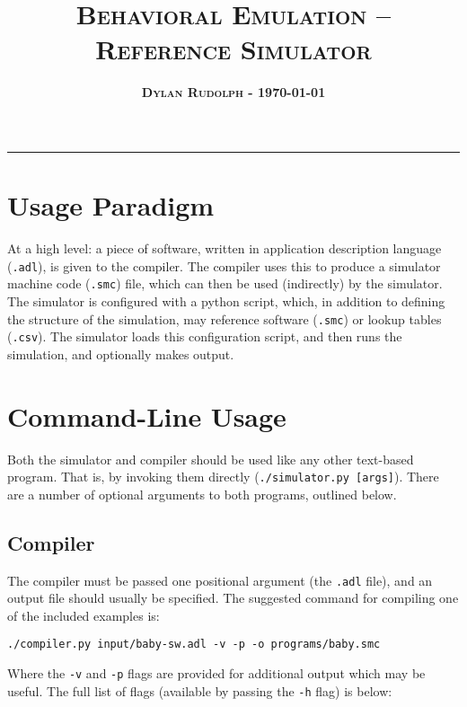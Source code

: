 \documentclass [letterpaper, 10pt, notitlepage, fleqn, oneside, 
  landscape] {article}
\title{\vspace{-5.0ex} \huge \bf \textsc{
    Behavioral Emulation -- Reference Simulator
    } \vspace{-1.5ex} }
\author{\large \bf \textsc{Dylan Rudolph - \today} }
\date{\vspace{-6.6ex}}
\begin{document}
\setlength{\pdfpagewidth}{11in}
\setlength{\pdfpageheight}{8.5in}

\maketitle
\rule{\textwidth}{1pt}
\vspace{-0.50cm}
\begin{multicols}{2}

  \section{Usage Paradigm}

  At a high level: a piece of software, written in application
  description language (\texttt{.adl}), is given to the compiler. The
  compiler uses this to produce a simulator machine code
  (\texttt{.smc}) file, which can then be used (indirectly) by the
  simulator.  The simulator is configured with a python script, which,
  in addition to defining the structure of the simulation, may
  reference software (\texttt{.smc}) or lookup tables (\texttt{.csv}).
  The simulator loads this configuration script, and then runs the simulation,
  and optionally makes output.

  \section{Command-Line Usage}

  Both the simulator and compiler should be used like any other text-based
  program. That is, by invoking them directly (\texttt{./simulator.py [args]}).
  There are a number of optional arguments to both programs, outlined below.

  \subsection{Compiler}

  The compiler must be passed one positional argument (the \texttt{.adl} file),
  and an output file should usually be specified. The suggested command for
  compiling one of the included examples is:

  \texttt{\quad ./compiler.py input/baby-sw.adl -v -p -o programs/baby.smc}

  Where the \texttt{-v} and \texttt{-p} flags are provided for additional
  output which may be useful. The full list of flags (available by passing
  the \texttt{-h} flag) is below:


\end{multicols}
\end{document}
